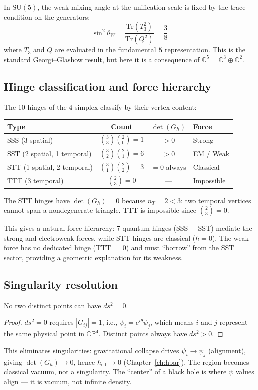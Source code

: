 In $\text{SU}(5)$, the weak mixing angle at the unification scale is fixed by the trace condition on the generators:
\begin{equation}
\sin^2\theta_W = \frac{\text{Tr}(T_3^2)}{\text{Tr}(Q^2)} = \frac{3}{8}
\end{equation}
where $T_3$ and $Q$ are evaluated in the fundamental $\mathbf{5}$ representation. This is the standard Georgi--Glashow result, but here it is a consequence of $\mathbb{C}^5 = \mathbb{C}^3 \oplus \mathbb{C}^2$.

\subsection{Hinge classification and force hierarchy}

The 10 hinges of the 4-simplex classify by their vertex content:

\begin{center}
\begin{tabular}{lccl}
\hline
Type & Count & $\det(G_h)$ & Force \\
\hline
SSS (3 spatial) & $\binom{3}{3}\binom{2}{0} = 1$ & $> 0$ & Strong \\
SST (2 spatial, 1 temporal) & $\binom{3}{2}\binom{2}{1} = 6$ & $> 0$ & EM / Weak \\
STT (1 spatial, 2 temporal) & $\binom{3}{1}\binom{2}{2} = 3$ & $= 0$ always & Classical \\
TTT (3 temporal) & $\binom{2}{3} = 0$ & --- & Impossible \\
\hline
\end{tabular}
\end{center}

The STT hinges have $\det(G_h) = 0$ because $n_T = 2 < 3$: two temporal vertices cannot span a nondegenerate triangle. TTT is impossible since $\binom{2}{3} = 0$.

This gives a natural force hierarchy: 7 quantum hinges (SSS + SST) mediate the strong and electroweak forces, while STT hinges are classical ($\hbar = 0$). The weak force has no dedicated hinge (TTT $= 0$) and must ``borrow'' from the SST sector, providing a geometric explanation for its weakness.

\subsection{Singularity resolution}

\begin{proposition}
No two distinct points can have $ds^2 = 0$.
\end{proposition}

\begin{proof}
$ds^2 = 0$ requires $|G_{ij}| = 1$, i.e., $\psi_i = e^{i\theta}\psi_j$, which means $i$ and $j$ represent the same physical point in $\mathbb{CP}^4$. Distinct points always have $ds^2 > 0$.
\end{proof}

This eliminates singularities: gravitational collapse drives $\psi_i \to \psi_j$ (alignment), giving $\det(G_h) \to 0$, hence $\hbar_\text{eff} \to 0$ (Chapter~\ref{ch:hbar}). The region becomes classical vacuum, not a singularity. The ``center'' of a black hole is where $\psi$ values align --- it is vacuum, not infinite density.
